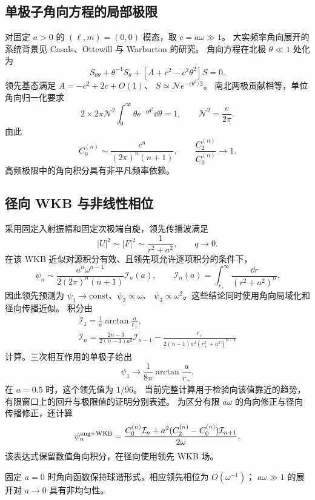 \documentclass[UTF8,fontset=fandol,11pt,a4paper]{ctexart}
\numberwithin{equation}{section}
\begin{document}
\subsection{单极子角向方程的局部极限}
对固定 $a>0$ 的 $(\ell,m)=(0,0)$ 模态，取 $c=a\omega\gg1$。
大实频率角向展开的系统背景见 Casals、Ottewill 与 Warburton 的研究\cite{Casals2019}。
角向方程在北极 $\theta\ll1$ 处化为
\begin{equation}
S_{\theta\theta}+\theta^{-1}S_\theta+
[A+c^2-c^2\theta^2]S=0.
\end{equation}
领先基态满足 $A=-c^2+2c+O(1)$、
$S\simeq\mathcal N e^{-c\theta^2/2}$。
南北两极贡献相等，单位角向归一化要求
\begin{equation}
2\times2\pi\mathcal N^2\int_0^\infty\theta e^{-c\theta^2}\dd\theta=1,
\qquad\mathcal N^2=\frac{c}{2\pi}.
\end{equation}
由此
\begin{equation}
C_0^{(n)}\sim\frac{c^n}{(2\pi)^n(n+1)},\qquad
\frac{C_2^{(n)}}{C_0^{(n)}}\to1.
\end{equation}
高频极限中的角向积分具有非平凡频率依赖。

\subsection{径向 WKB 与非线性相位}
采用固定入射振幅和固定次极端自旋，领先传播波满足
\begin{equation}
|U|^2\sim|F|^2\sim\frac1{r^2+a^2},\qquad q\to0.
\end{equation}
在该 WKB 近似对源积分有效、且领先项允许逐项积分的条件下，
\begin{equation}
\psi_n\sim\frac{a^n\omega^{n-1}}{2(2\pi)^n(n+1)}
\mathcal I_n(a),\qquad
\mathcal I_n(a)=\int_{r_+}^\infty\frac{\dd r}{(r^2+a^2)^n}.
\end{equation}
因此领先预测为 $\psi_1\to\mathrm{const}$、$\psi_2\propto\omega$、
$\psi_3\propto\omega^2$。这些结论同时使用角向局域化和径向传播近似。
积分由
\begin{gather}
\mathcal I_1=\frac1a\arctan\frac a{r_+},\\
\mathcal I_n=\frac{2n-3}{2(n-1)a^2}\mathcal I_{n-1}
-\frac{r_+}{2(n-1)a^2(r_+^2+a^2)^{n-1}}
\end{gather}
计算。三次相互作用的单极子给出
\begin{equation}
\boxed{\psi_1\longrightarrow\frac1{8\pi}\arctan\frac a{r_+}.}
\end{equation}
在 $a=0.5$ 时，这个领先值为 $1/96$。
当前完整计算用于检验向该值靠近的趋势，有限窗口上的回升与极限值的证明分别表述。
为区分有限 $a\omega$ 的角向修正与径向传播修正，还计算
\begin{equation}
\psi_n^{\rm ang+WKB}=\frac{C_0^{(n)}\mathcal I_n+
a^2(C_2^{(n)}-C_0^{(n)})\mathcal I_{n+1}}{2\omega}.
\end{equation}
该表达式保留数值角向积分，在径向使用领先 WKB 场。

固定 $a=0$ 时角向函数保持球谐形式，相应领先相位为 $O(\omega^{-1})$；
$a\omega\gg1$ 的展开对 $a\to0$ 具有非均匀性。
\end{document}
